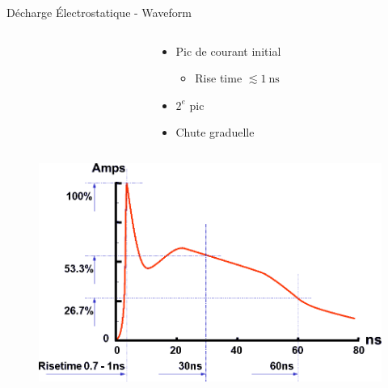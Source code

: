 \begin{frame}{Décharge Électrostatique - Waveform}
    \begin{columns}
        \begin{column}{0.6\textwidth}
        \end{column}
        \begin{column}{0.5\textwidth}
            \begin{itemize}
                \item Pic de courant initial
                \begin{itemize}
                    \item Rise time $\lesssim \SI{1}{\nano\second}$
                \end{itemize}
                \item $2^e$ pic
                \item Chute graduelle
            \end{itemize}
        \end{column}
    \end{columns}

    \vspace{-66pt}

    \begin{figure}
        \centering
        \includegraphics[width=\textwidth, height=0.8\textheight, keepaspectratio]{pictures/ESD-discharge-waveform.png}
    \end{figure}
\end{frame}

